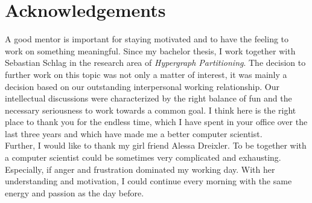 \documentclass[12pt,a4paper,twoside, enabledeprecatedfontcommands]{scrartcl}
\numberwithin{equation}{section}
\begin{document}
\vfill


\vfill\vfill\vfill
\clearpage


\vspace*{0pt}\vfill

\section*{Acknowledgements}

A good mentor is important for staying motivated and to have the feeling to work
on something meaningful. Since my bachelor thesis, I work together with Sebastian
Schlag in the research area of \emph{Hypergraph Partitioning}. The decision to further
work on this topic was not only a matter of interest, it was mainly a decision based
on our outstanding interpersonal working relationship. Our intellectual discussions
were characterized by the right balance of fun and the necessary seriousness to work towards
a common goal. I think here is the right place to thank you for the endless time, which I have spent
in your office over the last three years and which have made me a better computer scientist. \\
Further, I would like to thank my girl friend Alessa Dreixler. To be together with a 
computer scientist could be sometimes very complicated and exhausting. Especially,
if anger and frustration dominated my working day. With her understanding and motivation, 
I could continue every morning with the same energy and passion as the day before.


\vfill\vfill\vfill
\clearpage


\pagestyle{normal}
\renewcommand\sectionmark[1]{\markboth{\thesection\quad\MakeUppercase{#1}}{\thesection\quad\MakeUppercase{#1}}}
\renewcommand\subsectionmark[1]{\markright{\thesubsection\quad\MakeUppercase{#1}}}

\tableofcontents

\clearpage


%
\end{document}
